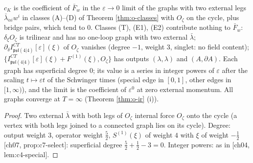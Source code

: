 \begin{proposition}[Graphs of $c_K$]
\label{prop:o-cKgraphs}
$c_K$ is the coefficient of $\bar F_w$ in the $\varepsilon\to0$ limit of the graphs with two external legs $\bar\lambda_{\dot\alpha i}w^i$ in classes (A)--(D) of Theorem \ref{thm:o-classes} with $O_\zeta$ on the cycle, plus bridge pairs, which tend to $0$. Classes (T), (E1), (E2) contribute nothing to $\bar F_w$: $\delta_\xi O_\zeta$ is trilinear and has no one-loop graph with two external $\bar\lambda$; $\partial_\delta I^{CT}_{\mathfrak{psl}(4|4)}[\varepsilon](\xi)$ of $O_\zeta$ vanishes (degree $-1$, weight $3$, singlet: no field content); $\{I^{CT}_{\mathfrak{psl}(4|4)}[\varepsilon](\xi)+F^{(1)}(\xi),O_\zeta\}$ has outputs $(\lambda,\lambda)$ and $(A,\partial A)$. Each graph has superficial degree $0$; its value is a series in integer powers of $\varepsilon$ after the scaling $t\mapsto\varepsilon t$ of the Schwinger times (special edge in $[0,1]$, other edges in $[1,\infty)$), and the limit is the coefficient of $\varepsilon^0$ at zero external momentum. All graphs converge at $T=\infty$ (Theorem \ref{thm:o-ir} (i)).
\end{proposition}

\begin{proof}
Two external $\bar\lambda$ with both legs of $O_\zeta$ internal force $O_\zeta$ onto the cycle (a vertex with both legs joined to a connected graph lies on its cycle). Degree: output weight $3$, operator weight $\tfrac52$, $S^{(1)}(\xi)$ of weight $4$ with $\xi$ of weight $-\tfrac12$ [ch07, prop:c7-select]: superficial degree $\tfrac52+\tfrac12-3=0$. Integer powers: as in [ch04, lem:c4-special].
\end{proof}

